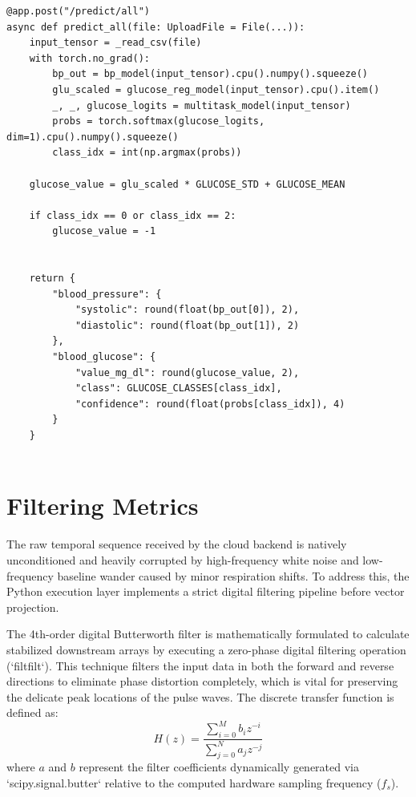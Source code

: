 \begin{verbatim}
@app.post("/predict/all")
async def predict_all(file: UploadFile = File(...)):
    input_tensor = _read_csv(file)
    with torch.no_grad():
        bp_out = bp_model(input_tensor).cpu().numpy().squeeze()
        glu_scaled = glucose_reg_model(input_tensor).cpu().item()
        _, _, glucose_logits = multitask_model(input_tensor)
        probs = torch.softmax(glucose_logits, dim=1).cpu().numpy().squeeze()
        class_idx = int(np.argmax(probs))

    glucose_value = glu_scaled * GLUCOSE_STD + GLUCOSE_MEAN
    
    if class_idx == 0 or class_idx == 2:
        glucose_value = -1
    

    return {
        "blood_pressure": {
            "systolic": round(float(bp_out[0]), 2),
            "diastolic": round(float(bp_out[1]), 2)
        },
        "blood_glucose": {
            "value_mg_dl": round(glucose_value, 2),
            "class": GLUCOSE_CLASSES[class_idx],
            "confidence": round(float(probs[class_idx]), 4)
        }
    }
    
\end{verbatim}
\vspace{1.5em}

\section{Filtering Metrics}
The raw temporal sequence received by the cloud backend is natively unconditioned and heavily corrupted by high-frequency white noise and low-frequency baseline wander caused by minor respiration shifts. To address this, the Python execution layer implements a strict digital filtering pipeline before vector projection.

The 4th-order digital Butterworth filter is mathematically formulated to calculate stabilized downstream arrays by executing a zero-phase digital filtering operation (`filtfilt`). This technique filters the input data in both the forward and reverse directions to eliminate phase distortion completely, which is vital for preserving the delicate peak locations of the pulse waves. The discrete transfer function is defined as:
\begin{equation}
H(z) = \frac{\sum_{i=0}^{M} b_i z^{-i}}{\sum_{j=0}^{N} a_j z^{-j}}
\end{equation}
where $a$ and $b$ represent the filter coefficients dynamically generated via `scipy.signal.butter` relative to the computed hardware sampling frequency ($f_s$).

